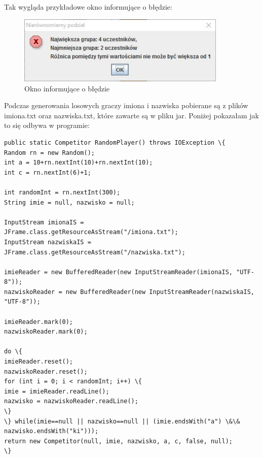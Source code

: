 Tak wygląda przykładowe okno informujące o błędzie:
\begin{figure}[H]
	\centering
	\includegraphics[width=10cm]{fig/m5}
	\caption{Okno informujące o błędzie}
	\label {fig:OknoBledu} 
\end{figure}

Podczas generowania losowych graczy imiona i nazwiska pobierane są z plików imiona.txt oraz nazwiska.txt, które zawarte są w pliku jar. Poniżej pokazałam jak to się odbywa w programie:
\begin{verbatim}
public static Competitor RandomPlayer() throws IOException \{
Random rn = new Random();
int a = 10+rn.nextInt(10)+rn.nextInt(10);
int c = rn.nextInt(6)+1;

int randomInt = rn.nextInt(300);
String imie = null, nazwisko = null;

InputStream imionaIS = JFrame.class.getResourceAsStream("/imiona.txt");
InputStream nazwiskaIS = JFrame.class.getResourceAsStream("/nazwiska.txt");

imieReader = new BufferedReader(new InputStreamReader(imionaIS, "UTF-8"));
nazwiskoReader = new BufferedReader(new InputStreamReader(nazwiskaIS, "UTF-8"));

imieReader.mark(0);
nazwiskoReader.mark(0);

do \{
imieReader.reset();
nazwiskoReader.reset();
for (int i = 0; i < randomInt; i++) \{
imie = imieReader.readLine();
nazwisko = nazwiskoReader.readLine();
\}
\} while(imie==null || nazwisko==null || (imie.endsWith("a") \&\& nazwisko.endsWith("ki")));
return new Competitor(null, imie, nazwisko, a, c, false, null);
\}
\end{verbatim}

